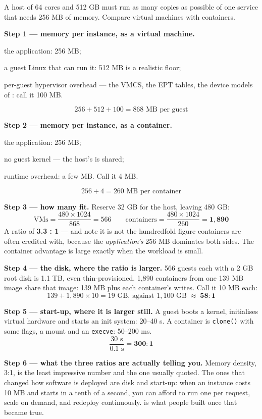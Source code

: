 \begin{worked}
A host of 64 cores and 512 GB must run as many copies as possible of one
service that needs 256 MB of memory. Compare virtual machines with containers.

\smallskip
\textbf{Step 1 --- memory per instance, as a virtual machine.}
\begin{tight}
  \item the application: 256 MB;
  \item a guest Linux that can run it: 512 MB is a realistic floor;
  \item per-guest hypervisor overhead --- the VMCS, the EPT tables, the device
        models of : call it 100 MB.
\end{tight}
\[ 256 + 512 + 100 = 868 \text{ MB per guest} \]

\smallskip
\textbf{Step 2 --- memory per instance, as a container.}
\begin{tight}
  \item the application: 256 MB;
  \item no guest kernel --- the host's is shared;
  \item runtime overhead: a few MB. Call it 4 MB.
\end{tight}
\[ 256 + 4 = 260 \text{ MB per container} \]

\smallskip
\textbf{Step 3 --- how many fit.} Reserve 32 GB for the host, leaving 480 GB:
\[ \text{VMs} = \frac{480 \times 1024}{868} = 566 \qquad
   \text{containers} = \frac{480 \times 1024}{260} = \mathbf{1{,}890} \]
A ratio of \textbf{3.3 : 1} --- and note it is not the hundredfold figure
containers are often credited with, because the \emph{application's} 256 MB
dominates both sides. The container advantage is large exactly when the
workload is small.

\smallskip
\textbf{Step 4 --- the disk, where the ratio is larger.} 566 guests each with a
2 GB root disk is 1.1 TB, even thin-provisioned. 1{,}890 containers from one
139 MB image share that image: 139 MB plus each container's writes. Call it
10 MB each:
\[ 139 + 1{,}890 \times 10 = 19 \text{ GB, against } 1{,}100 \text{ GB}
   \;\approx\; \mathbf{58 : 1} \]

\smallskip
\textbf{Step 5 --- start-up, where it is larger still.} A guest boots a kernel,
initialises virtual hardware and starts an init system: 20--40 s. A container
is \texttt{clone()} with some flags, a mount and an \texttt{execve}: 50--200 ms.
\[ \frac{30 \text{ s}}{0.1 \text{ s}} = \mathbf{300 : 1} \]

\smallskip
\textbf{Step 6 --- what the three ratios are actually telling you.} Memory
density, 3:1, is the least impressive number and the one usually quoted. The
ones that changed how software is deployed are disk and start-up: when an
instance costs 10 MB and starts in a tenth of a second, you can afford to run
one per request, scale on demand, and redeploy continuously. 
is what people built once that became true.
\end{worked}

